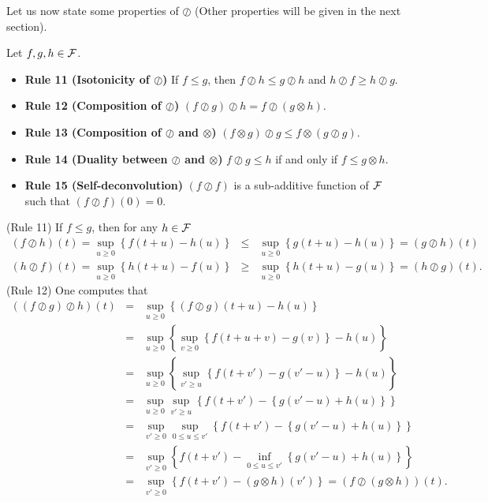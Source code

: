 Let us now state some properties of $\oslash$ (Other properties will be given in the next section).
\begin{theorem}
Let $f, g, h \in \mathcal F$.
\begin{itemize}
\item{\textbf{Rule 11 (Isotonicity of $\oslash$)} If $f \leq g$, then $f \oslash h \leq g \oslash h$ and
$h \oslash f \geq h \oslash g$.}
\item{\textbf{Rule 12 (Composition of $\oslash$)} $(f \oslash g) \oslash h = f \oslash (g \otimes h)$.}
\item{\textbf{Rule 13 (Composition of $\oslash$ and $\otimes$)} $(f \otimes g) \oslash g \leq f \otimes (g \oslash g)$.}
\item{\textbf{Rule 14 (Duality between $\oslash$ and $\otimes$)} $f \oslash g \leq h$ if and only if
 $f \leq g \otimes h$.}
\item{\textbf{Rule 15 (Self-deconvolution)} $(f \oslash f)$ is a sub-additive function of $\mathcal F$ such that $(f \oslash f)(0) = 0$.}
\end{itemize}
\end{theorem}
\pr (Rule 11) If $f \leq g$, then for any $h \in \mathcal F$
\begin{eqnarray*}
(f \oslash h)(t)  =  \sup_{u \geq 0} \left\{ f(t+u) - h(u) \right\} & \leq &
           \sup_{u \geq 0} \left\{ g(t+u) - h(u) \right\} = (g \oslash h)(t) \\
(h \oslash f)(t)  =  \sup_{u \geq 0} \left\{ h(t+u) - f(u) \right\} & \geq &
           \sup_{u \geq 0} \left\{ h(t+u) - g(u) \right\} = (h \oslash g)(t)  .
\end{eqnarray*}
\vspace{1ex}
\noindent
(Rule 12) One computes that
\begin{eqnarray*}
((f \oslash g) \oslash h)(t) & = & \sup_{u \geq 0}  \left\{ (f \oslash g)(t+u) - h(u) \right\} \\
                & = & \sup_{u \geq 0}  \left\{ \sup_{v \geq 0} \left\{ f(t+u+v) - g(v) \right\} - h(u) \right\} \\
                 & = & \sup_{u \geq 0}  \left\{ \sup_{v' \geq u} \left\{ f(t+v') - g(v'-u) \right\} - h(u) \right\} \\
            & = & \sup_{u \geq 0}  \sup_{v' \geq u}  \left\{ f(t+v') -  \left\{  g(v'-u) + h(u)  \right\}\right\} \\
            & = & \sup_{v' \geq 0}  \sup_{0 \leq u \leq v'}  \left\{ f(t+v') -  \left\{  g(v'-u) + h(u)  \right\} \right\} \\
            & = & \sup_{v' \geq 0} \left\{ f(t+v') - \inf_{0 \leq u \leq v'} \left\{  g(v'-u) + h(u)  \right\} \right\} \\
            & = & \sup_{v' \geq 0} \left\{ f(t+v') - (g \otimes h)(v')  \right\} = (f \oslash (g \otimes h))(t)
.
\end{eqnarray*}
